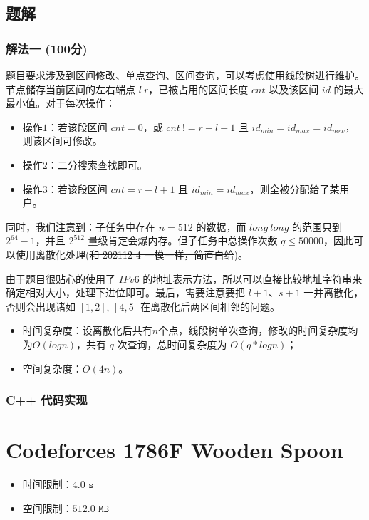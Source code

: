\documentclass[UTF8, 12pt, a4paper, oneside]{ctexart}
\begin{document}
\subsection{题解}
\subsubsection{解法一 (100分)}
\par 题目要求涉及到区间修改、单点查询、区间查询，可以考虑使用线段树进行维护。节点储存当前区间的左右端点 $l \ r$，已被占用的区间长度 $cnt$ 以及该区间 $id$ 的最大最小值。对于每次操作：
\begin{itemize}
    \item 操作$1$：若该段区间 $cnt = 0$，或 $cnt \ != r - l + 1$ 且 $id_{min} = id_{max} = id_{now}$，则该区间可修改。
    \item 操作$2$：二分搜索查找即可。
    \item 操作$3$：若该段区间 $cnt = r - l + 1$ 且 $id_{min} = id_{max}$，则全被分配给了某用户。
\end{itemize}
\par 同时，我们注意到：子任务中存在 $n = 512$ 的数据，而 $long \ long$ 的范围只到 $2^{64} - 1$，并且 $2^{512}$ 量级肯定会爆内存。但子任务中总操作次数 $q \leq 50000$，因此可以使用离散化处理(\sout{和 202112-4 一模一样，简直白给})。
\par 由于题目很贴心的使用了 $IPv6$ 的地址表示方法，所以可以直接比较地址字符串来确定相对大小，处理下进位即可。最后，需要注意要把 $l + 1$、$s + 1$ 一并离散化，否则会出现诸如 $[1,2]$, $[4,5]$在离散化后两区间相邻的问题。
\begin{itemize}
    \item 时间复杂度：设离散化后共有$n$个点，线段树单次查询，修改的时间复杂度均为$O(logn)$，共有 $q$ 次查询，总时间复杂度为 $O(q*logn)$；
    \item 空间复杂度：$O(4n)$。
\end{itemize}
\subsubsection{C++ 代码实现}


\newpage
\section{Codeforces 1786F Wooden Spoon}
\begin{itemize}
    \item 时间限制：$4.0\texttt{ s}$
    \item 空间限制：$512.0\texttt{ MB}$
\end{itemize}
\end{document}
